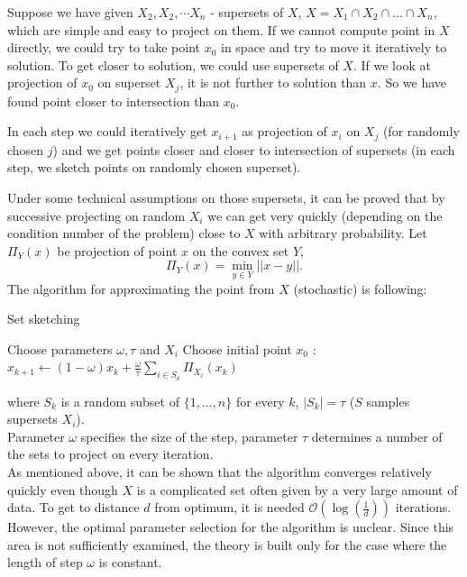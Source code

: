 \documentclass[11pt]{book}
\begin{document}
Suppose we have given $X_2 , X_2 , \cdots X_n$ - supersets of $X$, $X=X_1 \cap X_2 \cap \dots \cap X_n$, which are simple and easy to project on them. If we cannot compute point in $X$ directly, we could try to take point $x_0$ in space and try to move it iteratively to solution. To get closer to solution, we could use supersets of $X$. If we look at projection of $x_0$ on superset $X_j$, it is not further to solution than $x$. So we have found point closer to intersection than $x_0$.

In each step we could iteratively get $x_{i+1}$ as projection of $x_i$ on $X_j$ (for randomly chosen $j$) and we get points closer and closer to intersection of supersets (in each step, we sketch points on randomly chosen superset).

Under some technical assumptions on those supersets, it can be proved that by successive projecting on random $X_i$ we can get very quickly (depending on the condition number of the problem) close to $X$ with arbitrary probability. Let $\Pi_Y(x)$ be projection of point $x$ on the convex set $Y$, $$\Pi_Y(x) = \min_{y \in Y} ||x-y||.$$ The algorithm for approximating the point from $X$ (stochastic) is following:

\begin{algorithm}[H]
	\caption{Set sketching \cite{projectionFeasibility,kaczmarz}}
	\label{alg:set sketch}
	\begin{algorithmic}[1]
		\State Choose parameters $\omega, \tau$ and $ X_i$
		\State Choose initial point $x_0$
		:
		\State $x_{k+1} \leftarrow (1 - \omega)x_k + \frac{\omega}{\tau}\sum_{i \in S_k} \Pi_{X_i}(x_k)$
		\EndFor
	\end{algorithmic}
\end{algorithm}

\noindent
where $S_k$ is a random subset of $\{ 1, \dots , n\}$ for every $k$, $|S_k|=\tau$ ($S$ samples supersets $X_i$).\\

Parameter $\omega$ specifies the size of the step, parameter $\tau$ determines a number of the sets to project on every iteration.\\

As mentioned above, it can be shown that the algorithm converges relatively quickly even though $X$ is a complicated set often given by a very large amount of data. To get to distance $d$ from optimum, it is needed $\mathcal{O} (\log(\frac{1}{d}))$ iterations\cite{sketchAndProject,kaczmarz}.  However, the optimal parameter selection for the algorithm is unclear. Since this area is not sufficiently examined, the theory is built only for the case where the length of step $\omega$ is constant.\\
\end{document}
